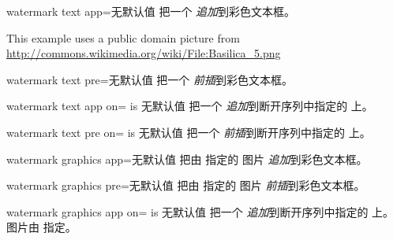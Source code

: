 \begin{docTcbKey}{watermark text app}{=}{无默认值}
  把一个  \emph{追加}到彩色文本框。
\begin{dispExample}

\begin{tcolorbox}[enhanced,title=My title,watermark graphics=Basilica_5.png,
  watermark opacity=0.25,
  watermark text app=Basilica,watermark color=Navy
  ]
\lipsum[1-2]
\tcblower
This example uses a public domain picture from\\
\url{http://commons.wikimedia.org/wiki/File:Basilica_5.png}
\end{tcolorbox}
\end{dispExample}
\end{docTcbKey}

\begin{docTcbKey}{watermark text pre}{=}{无默认值}
  把一个  \emph{前插}到彩色文本框。
\end{docTcbKey}

\begin{docTcbKey}{watermark text app on}{= is }{无默认值}
  把一个  \emph{追加}到断开序列中指定的  上。
\end{docTcbKey}

\begin{docTcbKey}{watermark text pre on}{= is }{无默认值}
  把一个  \emph{前插}到断开序列中指定的  上。
\end{docTcbKey}

\clearpage
\begin{docTcbKey}{watermark graphics app}{=}{无默认值}
  把由  指定的  图片 \emph{追加}到彩色文本框。
\end{docTcbKey}

\begin{docTcbKey}{watermark graphics pre}{=}{无默认值}
  把由  指定的  图片 \emph{前插}到彩色文本框。
\end{docTcbKey}

\begin{docTcbKey}{watermark graphics app on}{= is }{无默认值}
  把一个  \emph{追加}到断开序列中指定的  上。
  图片由  指定。
\end{docTcbKey}


